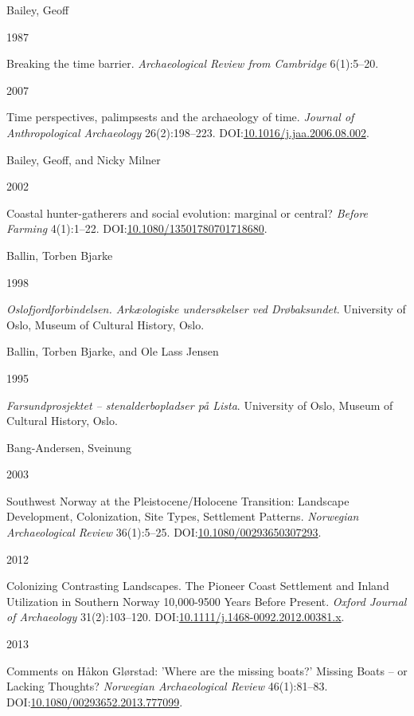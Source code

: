 \documentclass[
  12pt,
  a4paper,
  oneside]{book}
\newlength{\cslhangindent}
\newlength{\csllabelwidth}
\newlength{\cslentryspacingunit} %
\newenvironment{CSLReferences}[2] %
 {%
  \setlength{\parindent}{0pt}
  \ifodd #1
  \let\oldpar\par
  \def\par{\hangindent=\cslhangindent\oldpar}
  \fi
  \setlength{\parskip}{#2\cslentryspacingunit}
 }%
 {}
\newcommand{\CSLBlock}[1]{#1\hfill\break}
\newcommand{\CSLLeftMargin}[1]{\parbox[t]{\csllabelwidth}{#1}}
\newcommand{\CSLRightInline}[1]{\parbox[t]{\linewidth - \csllabelwidth}{#1}\break}
\begin{document}
\begin{CSLReferences}{0}{0}
\leavevmode{}%
\CSLBlock{Bailey, Geoff}
\CSLLeftMargin{ 1987}
\CSLRightInline{Breaking the time barrier. \emph{Archaeological Review from Cambridge} 6(1):5--20.}

\leavevmode{}%
\CSLLeftMargin{ 2007 }
\CSLRightInline{Time perspectives, palimpsests and the archaeology of time. \emph{Journal of Anthropological Archaeology} 26(2):198--223. DOI:\href{https://doi.org/10.1016/j.jaa.2006.08.002}{10.1016/j.jaa.2006.08.002}.}

\leavevmode{}%
\CSLBlock{Bailey, Geoff, and Nicky Milner}
\CSLLeftMargin{ 2002}
\CSLRightInline{{Coastal hunter-gatherers and social evolution: marginal or central?} \emph{Before Farming} 4(1):1--22. DOI:\href{https://doi.org/10.1080/13501780701718680}{10.1080/13501780701718680}.}

\leavevmode{}%
\CSLBlock{Ballin, Torben Bjarke}
\CSLLeftMargin{ 1998}
\CSLRightInline{\emph{{Oslofjordforbindelsen. Arkæologiske undersøkelser ved Drøbaksundet}}. University of Oslo, Museum of Cultural History, Oslo.}

\leavevmode{}%
\CSLBlock{Ballin, Torben Bjarke, and Ole Lass Jensen}
\CSLLeftMargin{ 1995}
\CSLRightInline{\emph{{Farsundprosjektet -- stenalderbopladser på Lista}}. University of Oslo, Museum of Cultural History, Oslo.}

\leavevmode{}%
\CSLBlock{Bang-Andersen, Sveinung}
\CSLLeftMargin{ 2003}
\CSLRightInline{{Southwest Norway at the Pleistocene/Holocene Transition: Landscape Development, Colonization, Site Types, Settlement Patterns}. \emph{Norwegian Archaeological Review} 36(1):5--25. DOI:\href{https://doi.org/10.1080/00293650307293}{10.1080/00293650307293}.}

\leavevmode{}%
\CSLLeftMargin{ 2012 }
\CSLRightInline{{Colonizing Contrasting Landscapes. The Pioneer Coast Settlement and Inland Utilization in Southern Norway 10,000-9500 Years Before Present}. \emph{Oxford Journal of Archaeology} 31(2):103--120. DOI:\href{https://doi.org/10.1111/j.1468-0092.2012.00381.x}{10.1111/j.1468-0092.2012.00381.x}.}

\leavevmode{}%
\CSLLeftMargin{ 2013 }
\CSLRightInline{{Comments on Håkon Glørstad: 'Where are the missing boats?' Missing Boats -- or Lacking Thoughts?} \emph{Norwegian Archaeological Review} 46(1):81--83. DOI:\href{https://doi.org/10.1080/00293652.2013.777099}{10.1080/00293652.2013.777099}.}


\end{CSLReferences}
\end{document}
